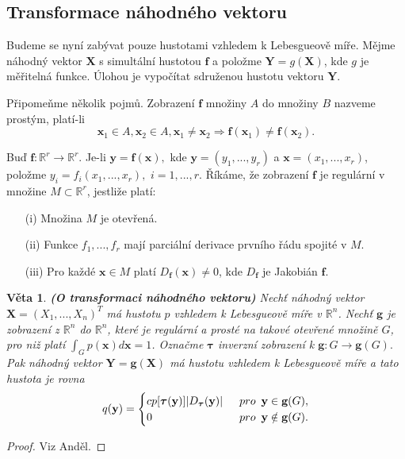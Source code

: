 \documentclass[a4]{report}
\newtheorem{theorem}{Věta}
\theoremstyle{definition}
\begin{document}
{\subsection{Transformace náhodného vektoru}
Budeme se nyní zabývat pouze hustotami vzhledem k Lebesgueově míře. Mějme náhodný vektor $\textbf{X}$ s simultální hustotou $\textbf{f}$ a položme $\textbf{Y} = g(\textbf{X})$, kde $g$ je měřitelná funkce. Úlohou je vypočítat sdruženou hustotu vektoru $\textbf{Y}$.

Připomeňme několik pojmů. Zobrazení $\mathbf{f}$ množiny $A$ do množiny $B$ nazveme prostým, platí-li
\begin{equation}
\textbf{x}_{1} \in A, \textbf{x}_{2} \in A, \textbf{x}_{1} \neq \textbf{x}_{2} \Longrightarrow \textbf{f}(\textbf{x}_{1}) \neq \textbf{f}(\textbf{x}_{2}).
\end{equation}

Buď $\textbf{f}: \mathbb{R}^{r} \longrightarrow \mathbb{R}^{r}.$ Je-li $\textbf{y} = \textbf{f}(\textbf{x}),$ kde $\textbf{y} = (y_{1}, ..., y_{r})$ a $\textbf{x} = (x_{1}, ..., x_{r})$, položme $y_{i} = f_{i}(x_{1}, ..., x_{r}),$ $i = 1, ..., r$. Říkáme, že zobrazení $\textbf{f}$ je regulární v množine $M \subset \mathbb{R}^{r}$, jestliže platí:
\begin{itemize}
\item[(i)] Množina $M$ je otevřená.
\item[(ii)] Funkce $f_{1}, ..., f_{r}$ mají parciální derivace prvního řádu spojité v $M$.
\item[(iii)] Pro každé $\textbf{x} \in M$ platí $D_{\mathbf{f}}(\textbf{x}) \neq 0$, kde $D_{\mathbf{f}}$ je Jakobián $\mathbf{f}$.
\end{itemize}

\begin{theorem}{\textbf{(O transformaci náhodného vektoru)}}
Nechť náhodný vektor $\textbf{X} = (X_{1}, ..., X_{n})^{T}$ má hustotu $p$ vzhledem k Lebesgueově míře v $\mathbb{R}^{n}$. Nechť $\textbf{g}$ je zobrazení z $\mathbb{R}^{n}$ do $\mathbb{R}^{n}$, které je regulární a prosté na takové otevřené množině $G$, pro niž platí $\int_{G} p(\textbf{x})d\textbf{x} = 1$. Označme $\bm{\tau}$ inverzní zobrazení k $\textbf{g}: G \longrightarrow \textbf{g}(G).$ Pak náhodný vektor $\textbf{Y} = \textbf{g}(\textbf{X})$ má hustotu vzhledem k Lebesgueově míře a tato hustota je rovna
\[
q(\textbf{y}) = 
\begin{cases}{c}
p[\bm{\tau}(\textbf{y})]|D_{\bm{\tau}}(\textbf{y})| & \enskip pro \enskip \textbf{y} \in \textbf{g}(G), \\
0 & \enskip pro \enskip \textbf{y} \notin \textbf{g}(G).
\end{cases}
\]
\end{theorem}
\begin{proof}
Viz Anděl.
\end{proof}
}
\end{document}
